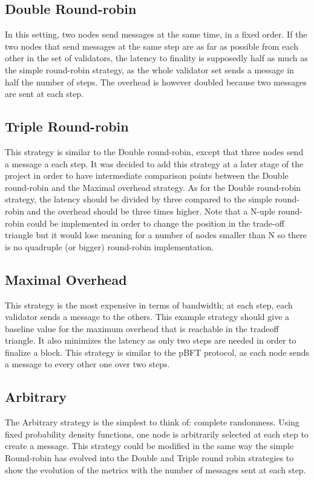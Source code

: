 \subsection{Double Round-robin}
In this setting, two nodes send messages at the same time, in a fixed order. If
the two nodes that send messages at the same step are as far as possible from each
other in the set of validators, the latency to finality is supposedly
half as much as the simple round-robin strategy, as the whole validator set
sends a message in half the number of steps. The overhead is however
doubled because two messages are sent at each step.

\subsection{Triple Round-robin}
This strategy is similar to the Double round-robin, except that three nodes send
a message a each step. It was decided to add this strategy at a later stage of
the project in order to have intermediate comparison points between the Double
round-robin and the Maximal overhead strategy. As for the Double round-robin
strategy, the latency should be divided by three compared to the simple
round-robin and the overhead should be three times higher.
Note that a N-uple round-robin could be implemented in order to change the
position in the trade-off triangle but it would lose meaning for a number of
nodes smaller than N so there is no quadruple (or bigger) round-robin
implementation.

\subsection{Maximal Overhead}
This strategy is the most expensive in terms of bandwidth; at each step, each
validator sends a message to the others. This example strategy should give a
baseline value for the maximum overhead that is reachable in the tradeoff
triangle. It also minimizes the latency as only two steps are needed in order to
finalize a block. This strategy is similar to the pBFT\cite{pBFT} protocol, as each
node sends a message to every other one over two steps.

\subsection{Arbitrary}
The Arbitrary strategy is the simplest to think of: complete randomness. Using fixed
probability density functions, one node is arbitrarily selected at each step to
create a message. This strategy could be modified in the same way the
simple Round-robin has evolved into the Double and Triple round robin
strategies to show the evolution of the metrics with the number of messages sent
at each step.

